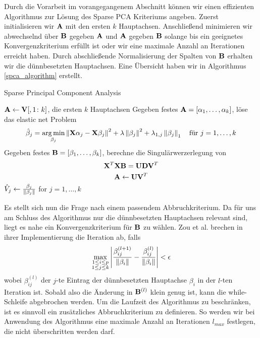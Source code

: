 Durch die Vorarbeit im vorangegangenem Abschnitt können wir einen effizienten Algorithmus zur Lösung des Sparse PCA Kriteriums angeben. Zuerst initialisieren wir $\mathbf{A}$ mit den ersten $k$ Hauptachsen. Anschließend minimieren wir abwechselnd über $\mathbf{B}$ gegeben $\mathbf{A}$ und $\mathbf{A}$ gegeben $\mathbf{B}$ solange bis ein geeignetes Konvergenzkriterium erfüllt ist oder wir eine maximale Anzahl an Iterationen erreicht haben. Durch abschließende Normalisierung der Spalten von $\mathbf{B}$ erhalten wir die dünnbesetzten Hauptachsen. Eine Übersicht haben wir in Algorithmus \ref{spca_algorithm} erstellt.

\begin{algorithm}[tbh]
    \caption{Sparse Principal Component Analysis}
    \label{spca_algorithm}
    \begin{algorithmic}[1]
        	\State $\mathbf{A} \gets \mathbf{V}[,1 \colon k]$, die ersten $k$ Hauptachsen
                \State Gegeben festes $\mathbf{A} = [\alpha_1, \ldots, \alpha_k]$, löse das elastic net Problem
                $$\hat{\beta}_j = \operatorname*{arg\,min}_{\beta_j} \left\lVert \mathbf{X} \alpha_j - \mathbf{X} \beta_j \right\rVert^{2} + \lambda \left\lVert \beta_j \right\rVert^2 + \lambda_{1,j}\left\lVert \beta_j \right\rVert_{1} \quad \text{für } j = 1, \ldots, k$$
                \State Gegeben festes $\mathbf{B} = [\beta_1, \ldots, \beta_k]$, berechne die Singulärwerzerlegung von $$\mathbf{X}^T \mathbf{X} \mathbf{B} = \mathbf{U} \mathbf{D} \mathbf{V}^T$$
                $$\mathbf{A} \gets \mathbf{U} \mathbf{V}^T$$
            \EndWhile
            \State $\hat{V}_j \gets \frac{\beta_j}{\left\lVert \beta_j \right\rVert}$ for $j = 1, \ldots, k$
        \EndProcedure
    \end{algorithmic}
\end{algorithm} 

Es stellt sich nun die Frage nach einem passendem Abbruchkriterium. Da für uns am Schluss des Algorithmus nur die dünnbesetzten Hauptachsen relevant sind, liegt es nahe ein Konvergenzkriterium für $\mathbf{B}$ zu wählen. Zou et al. brechen in ihrer Implementierung die Iteration ab, falls
$$\max_{\substack{1 \leq i \leq p \\ 1 \leq j \leq k}} \left| \frac{\beta_{ij}^{(l+1)}}{\left\lVert \beta_i \right\rVert} - \frac{\beta_{ij}^{(l)}}{\left\lVert \beta_i \right\rVert} \right| < \epsilon$$
wobei $\beta_{ij}^{(l)}$ der $j$-te Eintrag der dünnbesetzten Hauptachse $\beta_i$ in der $l$-ten Iteration ist. Sobald also die Änderung in $\mathbf{B}^{(l)}$ klein genug ist, kann die while-Schleife abgebrochen werden. Um die Laufzeit des Algorithmus zu beschränken, ist es sinnvoll ein zusätzliches Abbruchkriterium zu definieren. So werden wir bei Anwendung des Algorithmus eine maximale Anzahl an Iterationen $l_{max}$ festlegen, die nicht überschritten werden darf.




